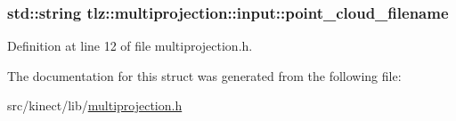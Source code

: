 \subsubsection[{\texorpdfstring{point\+\_\+cloud\+\_\+filename}{point_cloud_filename}}]{\setlength{\rightskip}{0pt plus 5cm}std\+::string tlz\+::multiprojection\+::input\+::point\+\_\+cloud\+\_\+filename}\hypertarget{structtlz_1_1multiprojection_1_1input_a1dfef32ce2e5ba23297696e305178c58}{}\label{structtlz_1_1multiprojection_1_1input_a1dfef32ce2e5ba23297696e305178c58}


Definition at line 12 of file multiprojection.\+h.



The documentation for this struct was generated from the following file\+:\begin{DoxyCompactItemize}
\item 
src/kinect/lib/\hyperlink{multiprojection_8h}{multiprojection.\+h}\end{DoxyCompactItemize}
